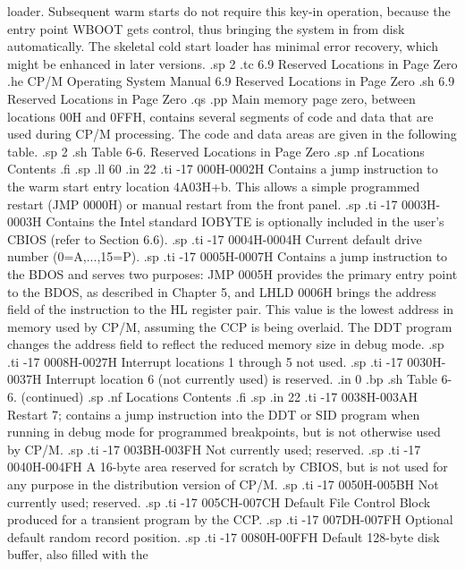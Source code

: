 loader.  Subsequent warm starts do not require this key-in 
operation, because the entry point WBOOT gets control, thus bringing 
the system in from disk automatically.  The skeletal cold start 
loader has minimal error recovery, which might be enhanced in later 
versions.
.sp 2
.tc    6.9  Reserved Locations in Page Zero
.he CP/M Operating System Manual 6.9  Reserved Locations in Page Zero
.sh
6.9  Reserved Locations in Page Zero
.qs
.pp
Main memory page zero, between locations 00H and 0FFH, contains 
several segments of code and data that are used during CP/M 
processing.  The code and data areas are given in the following table.
.sp 2
.sh
           Table 6-6.  Reserved Locations in Page Zero
.sp
.nf
     Locations                       Contents
.fi
.sp
.ll 60
.in 22
.ti -17
000H-0002H       Contains a jump instruction to the warm start entry location
4A03H+b.  This allows a simple programmed restart (JMP 0000H) or manual
restart from the front panel.
.sp
.ti -17
0003H-0003H      Contains the Intel standard IOBYTE is optionally
included in the user's CBIOS (refer to Section 6.6).
.sp
.ti -17
0004H-0004H      Current default drive number (0=A,...,15=P).
.sp
.ti -17
0005H-0007H      Contains a jump instruction to the BDOS and serves two
purposes:  JMP 0005H provides the primary entry point to the BDOS, as
described in Chapter 5, and LHLD 0006H brings the address field of the
instruction to the HL register pair.  This value is the lowest address in
memory used by CP/M, assuming the CCP is being overlaid.  The DDT program
changes the address field to reflect the reduced memory size in debug mode.
.sp
.ti -17
0008H-0027H      Interrupt locations 1 through 5 not used.
.sp
.ti -17
0030H-0037H      Interrupt location 6 (not currently used) is reserved.
.in 0
.bp
.sh
                     Table 6-6.  (continued)
.sp
.nf
     Locations                       Contents
.fi
.sp
.in 22
.ti -17
0038H-003AH      Restart 7; contains a jump instruction into the DDT or SID
program when running in debug mode for programmed breakpoints, but is not
otherwise used by CP/M.
.sp
.ti -17
003BH-003FH      Not currently used; reserved.
.sp
.ti -17
0040H-004FH      A 16-byte area reserved for scratch by CBIOS, but is not
used for any purpose in the distribution version of CP/M.
.sp
.ti -17
0050H-005BH      Not currently used; reserved.
.sp
.ti -17
005CH-007CH      Default File Control Block produced for a transient
program by the CCP.
.sp
.ti -17
007DH-007FH      Optional default random record position.
.sp
.ti -17
0080H-00FFH      Default 128-byte disk buffer, also filled with the
